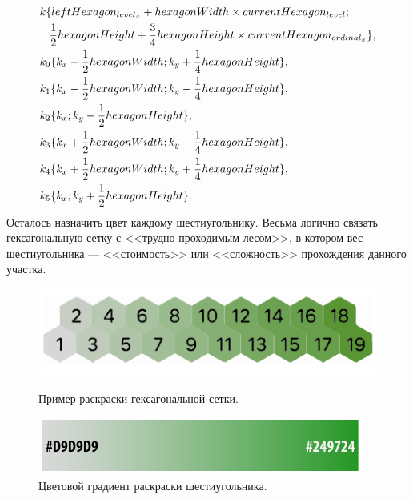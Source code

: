 \begin{equation}
\begin{aligned}
&k \{leftHexagon_{level_{x}} + hexagonWidth\times currentHexagon_{level};  \\
&\hspace{3mm}\frac{1}{2} hexagonHeight +\frac{3}{4} hexagonHeight\times currentHexagon_{ordinal_{x}}\},  \\
&k_{0}\{k_{x}-\frac{1}{2}hexagonWidth; k_{y}+\frac{1}{4}hexagonHeight\},  \\
&k_{1}\{k_{x}-\frac{1}{2}hexagonWidth; k_{y}-\frac{1}{4}hexagonHeight\},  \\
&k_{2}\{k_{x};k_{y}-\frac{1}{2}hexagonHeight\},  \\
&k_{3}\{k_{x}+\frac{1}{2}hexagonWidth; k_{y}-\frac{1}{4}hexagonHeight\},  \\
&k_{4}\{k_{x}+\frac{1}{2}hexagonWidth; k_{y}+\frac{1}{4}hexagonHeight\},  \\
&k_{5}\{k_{x};k_{y}+\frac{1}{2}hexagonHeight\}.
\end{aligned}
\end{equation}
Осталось назначить цвет каждому шестиугольнику. Весьма логично связать гексагональную сетку с <<трудно проходимым лесом>>, в котором вес шестиугольника --- <<стоимость>> или <<сложность>> прохождения данного участка.

\begin{figure}[h]
\begin{center}
\begin{minipage}[h]{0.47\linewidth}
\includegraphics[width=1\linewidth]{inc/img/hexagon_gradient}
\caption{Пример раскраски гексагональной сетки.} %
\label{axis:cube} %
\end{minipage}
\hfill 
\begin{minipage}[h]{0.47\linewidth}
\includegraphics[width=1\linewidth]{inc/img/gradient}
\caption{Цветовой градиент раскраски шестиугольника.}
\label{axis:axial}
\end{minipage}
\end{center}
\end{figure}

